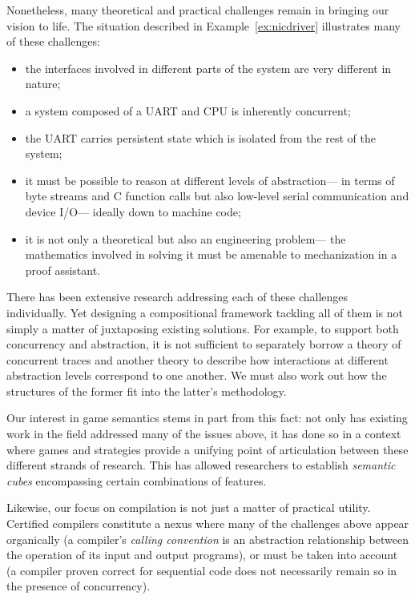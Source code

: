 Nonetheless,
many theoretical and practical challenges remain
in bringing our vision to life.
The situation described in Example~\ref{ex:nicdriver}
illustrates many of these challenges:
\begin{itemize} \itemsep 0pt
  \item the interfaces involved in different parts of the system
    are very different in nature;
  \item a system composed of a UART and CPU
    is inherently concurrent;
  \item the UART carries persistent state
    which is isolated from the rest of the system;
  \item it must be possible to reason at different levels of abstraction---%
    in terms of byte streams and C function calls
    but also low-level serial communication and device I/O---%
    ideally down to machine code;
  \item it is not only a theoretical but also an engineering problem---%
    the mathematics involved in solving it must be
    amenable to mechanization in a proof assistant.
\end{itemize}
There has been
extensive research
addressing each of these challenges individually.
Yet designing a compositional framework tackling all of them
is not simply a matter of juxtaposing existing solutions.
For example,
to support both concurrency and abstraction,
it is not sufficient to separately borrow
a theory of concurrent traces and
another theory to describe
how interactions at different abstraction levels
correspond to one another.
We must also work out how the structures
of the former
fit into the latter's methodology.

Our interest in game semantics
stems in part from this fact:
not only has existing work in the field
addressed many of the issues above,
it has done so in a context where games and strategies
provide a unifying point of articulation
between these different strands of research.
This has allowed researchers
to establish \emph{semantic cubes}
encompassing certain combinations of features.

Likewise,
our focus on compilation
is not just a matter of practical utility.
Certified compilers constitute a nexus where
many of the challenges above appear organically
(a compiler's \emph{calling convention} is an abstraction relationship
between the operation of its input and output programs),
or must be taken into account
(a compiler proven correct for sequential code
does not necessarily remain so in the presence of concurrency).

